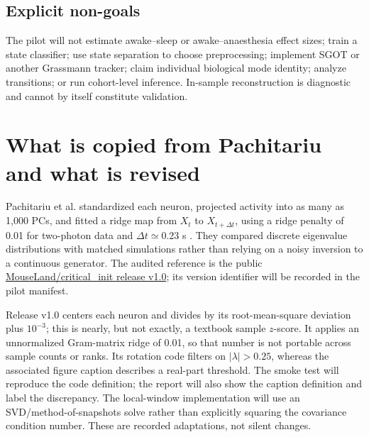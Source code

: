 \documentclass[11pt,a4paper]{article}
\begin{document}
\subsection{Explicit non-goals}

\begin{stopbox}
The pilot will not estimate awake--sleep or awake--anaesthesia effect sizes;
train a state classifier; use state separation to choose preprocessing; implement
SGOT or another Grassmann tracker; claim individual biological mode identity;
analyze transitions; or run cohort-level inference. In-sample reconstruction is
diagnostic and cannot by itself constitute validation.
\end{stopbox}

\section{What is copied from Pachitariu and what is revised}

Pachitariu et al. standardized each neuron, projected activity into as many as
1,000 PCs, and fitted a ridge map from $X_t$ to $X_{t+\Delta t}$, using a ridge
penalty of 0.01 for two-photon data and $\Delta t\simeq0.23$ s
\citep{pachitariu2026critical}. They compared discrete eigenvalue distributions
with matched simulations rather than relying on a noisy inversion to a
continuous generator. The audited reference is the public
\href{https://github.com/MouseLand/critical_init/tree/v1.0}{MouseLand/critical\_init
release v1.0}; its version identifier will be recorded in the pilot manifest.

\begin{riskbox}
Release v1.0 centers each neuron and divides by its root-mean-square deviation
plus $10^{-3}$; this is nearly, but not exactly, a textbook sample $z$-score.
It applies an unnormalized Gram-matrix ridge of 0.01, so that number is not
portable across sample counts or ranks. Its rotation code filters on
$|\lambda|>0.25$, whereas the associated figure caption describes a real-part
threshold. The smoke test will reproduce the code definition; the report will
also show the caption definition and label the discrepancy. The local-window
implementation will use an SVD/method-of-snapshots solve rather than explicitly
squaring the covariance condition number. These are recorded adaptations, not
silent changes.
\end{riskbox}
\end{document}
